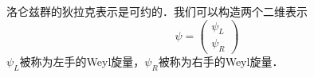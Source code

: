 
洛仑兹群的狄拉克表示是可约的．我们可以构造两个二维表示
\begin{equation}
\psi = \begin{pmatrix}
\psi_L \\
\psi_R
\end{pmatrix}
\end{equation}
$\psi_L$被称为左手的Weyl旋量，$\psi_R$被称为右手的Weyl旋量．

